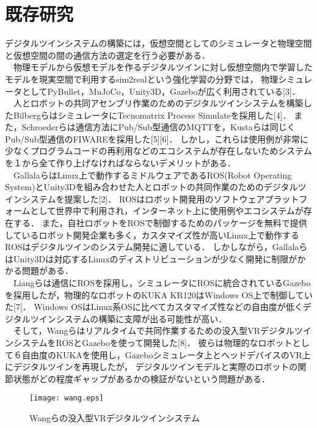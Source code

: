 \section{既存研究}
デジタルツインシステムの構築には，仮想空間としてのシミュレータと物理空間と仮想空間の間の通信方法の選定を行う必要がある．\\
　物理モデルから仮想モデルを作るデジタルツインに対し仮想空間内で学習したモデルを現実空間で利用するsim2realという強化学習の分野では，
物理シミュレータとしてPyBullet，MuJoCo，Unity3D，Gazeboが広く利用されている[3]．\\
　人とロボットの共同アセンブリ作業のためのデジタルツインシステムを構築したBilbergらはシミュレータにTecnomatrix Process Simulateを採用した[4]．
また，Schroederらは通信方法にPub/Sub型通信のMQTTを，Kustaらは同じくPub/Sub型通信のFIWAREを採用した[5][6]．
しかし，これらは使用例が非常に少なくプログラムコードの再利用などのエコシステムが存在しないためシステムを１から全て作り上げなければならないデメリットがある．\\
　GallalaらはLinux上で動作するミドルウェアであるROS(Robot Operating System)とUnity3Dを組み合わせた人とロボットの共同作業のためのデジタルツインシステムを提案した[2]．
ROSはロボット開発用のソフトウェアプラットフォームとして世界中で利用され，インターネット上に使用例やエコシステムが存在する．
また，自社ロボットをROSで制御するためのパッケージを無料で提供しているロボット開発企業も多く，カスタマイズ性が高いLinux上で動作するROSはデジタルツインのシステム開発に適している．
しかしながら，GallalaらはUnity3Dは対応するLinuxのディストリビューションが少なく開発に制限がかかる問題がある．\\
　Liangらは通信にROSを採用し，シミュレータにROSに統合されているGazeboを採用したが，物理的なロボットのKUKA KR120はWindows OS上で制御していた[7]．
Windows OSはLinux系OSに比べてカスタマイズ性などの自由度が低くデジタルツインシステムの構築に支障が出る可能性が高い．\\
　そして，Wangらはリアルタイムで共同作業するための没入型VRデジタルツインシステムをROSとGazeboを使って開発した[8]．
彼らは物理的なロボットとして６自由度のKUKAを使用し，Gazeboシミュレータ上とヘッドデバイスのVR上にデジタルツインを再現したが，
デジタルツインモデルと実際のロボットの関節状態がどの程度ギャップがあるかの検証がないという問題がある．

\begin{figure}[htbt]
	\centering
	 \texttt{[image: wang.eps]}
	 \caption{Wangらの没入型VRデジタルツインシステム}
	 \label{fig:f2}
\end{figure}

